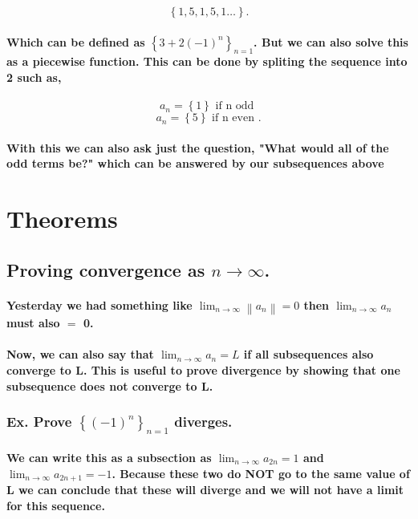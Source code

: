 \[
\left\{ 1,5,1,5,1 \ldots \right\} 
.\] 

\paragraph{Which can be defined as $ \left\{ 3+2\left( -1 \right) ^{ n } \right\} _{ n=1 } $. But we can also solve this as a piecewise function. This can be done by spliting the sequence into 2 such as, }

\[
a_n=\left\{ 1 \right\} \text{ if n odd }
\] 
\[
a_n=\left\{ 5 \right\} \text{ if n even }
.\] 

\paragraph{With this we can also ask just the question, "What would all of the odd terms be?" which can be answered by our subsequences above}


\section{Theorems}%
\label{sec:Theorems}

\subsection{Proving convergence as $ n\to \infty $.}

\paragraph{Yesterday we had something like $ \lim_{ n \to \infty} \left\| a_n \right\|=0 $ then $ \lim_{ n \to \infty} a_n $ must also $ = $ 0. }

\paragraph{Now, we can also say that $ \lim_{ n \to \infty} a_n=L $ if all subsequences also converge to L. This is useful to prove divergence by showing that one subsequence does not converge to L.}

\subsubsection{Ex. Prove $ \left\{ \left( -1 \right) ^{ n } \right\} _{ n=1 } $ diverges.}

\paragraph{We can write this as a subsection as $ \lim_{ n \to \infty} a_{ 2n }=1 $ and $ \lim_{ n \to \infty} a_{ 2n+1 }=-1 $. Because these two do NOT go to the same value of L we can conclude that these will diverge and we will not have a limit for this sequence.}

